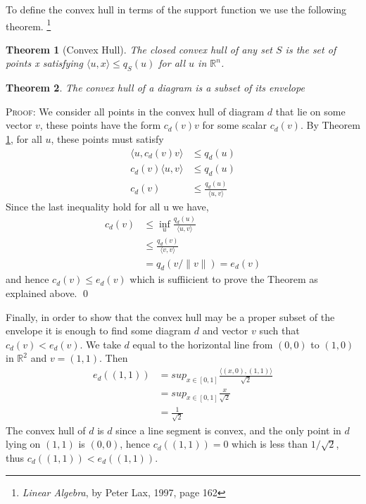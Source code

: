 \documentclass[11pt]{amsart}
\newtheorem{thm}{Theorem}
\begin{document}
To define the convex hull in terms of the support function we use the following theorem. 
\footnote{\emph{Linear Algebra}, by Peter Lax, 1997, page 162}

\begin{thm}[Convex Hull]
\label{convexhull} The closed convex hull of any set $S$ is the set of points x satisfying $\langle u, x \rangle \leq q_S(u)$ for all $u$ in $\mathbb{R}^n$.
\end{thm}

\begin{thm}
The convex hull of a diagram is a subset of its envelope
\end{thm}
\textsc{Proof}: We consider all points in the convex hull of diagram $d$ that lie on some vector $v$, these points have the form $c_d(v)v$ for some
scalar $c_d(v)$. By Theorem \ref{convexhull}, for all $u$, these points must satisfy
\begin{align}
\langle u, c_d(v)v \rangle &\leq q_d(u)\\
c_d(v)\langle u, v \rangle &\leq q_d(u)\\
c_d(v) &\leq  \frac{q_d(u)}{\langle u, v \rangle}
\end{align}
Since the last inequality hold for all u we have,
\begin{align}
c_d(v) &\leq \inf_u  \frac{q_d(u)}{\langle u, v \rangle}\\
&\leq \frac{q_d(v)}{\langle v, v \rangle} \\
&= q_d(v/\|v\|)= e_d(v) 
\end{align}
 and hence $c_d(v) \leq e_d(v)$ which is suffiicient to prove the Theorem as explained above. \qed
 
 Finally, in order to show that the convex hull may be a proper subset of the envelope it is enough to find some diagram $d$ and vector $v$ such that
 $c_d(v) < e_d(v)$. We take $d$ equal to the horizontal line from $(0,0)$ to $(1,0)$ in $\mathbb{R}^2$ and $v=(1,1)$. Then
 \begin{align}
 e_d((1,1)) &= sup_{x \in [0,1]} \frac{\langle (x,0), (1,1) \rangle}{\sqrt{2}}\\
                 &= sup_{x \in [0,1]} \frac{x}{\sqrt{2}}\\
                 &= \frac{1}{\sqrt{2}}
\end{align}
The convex hull of $d$ is $d$ since a line segment is convex, and the only point in $d$ lying on $(1,1)$ is $(0,0)$, hence $c_d((1,1)) = 0$ which is less than 
$1/\sqrt{2}$, thus $c_d((1,1)) < e_d((1,1))$.
\end{document}
